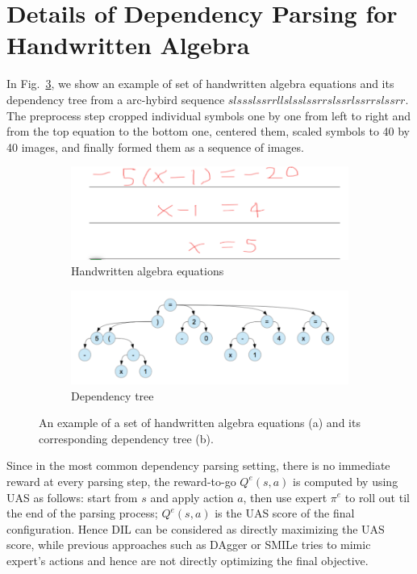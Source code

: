 \documentclass{article}
\begin{document}
\section{Details of Dependency Parsing for Handwritten Algebra}
\label{sec:parsing_example}
In Fig.~\ref{fig:algebra_example}, we show an example of set of handwritten algebra equations and its dependency tree from a arc-hybird sequence $slssslssrrllslsslssrrslssrlssrrslssrr$.  The preprocess step cropped individual symbols one by one from left to right and from the top equation to the bottom one, centered them, scaled symbols to 40 by 40 images,  and  finally formed  them  as  a  sequence of images. 

\begin{figure}[h]
	\centering
	\vspace{-2mm}
	\begin{subfigure}[l]{0.45\textwidth}
        \includegraphics[width=1.1\textwidth,keepaspectratio]{./figure/handwrittenexample.png}
        \caption{Handwritten algebra equations}
        \label{fig:cartpole}
    \end{subfigure}
	\begin{subfigure}[l]{0.5\textwidth}
        \includegraphics[width=1.1\textwidth,keepaspectratio]{./figure/handwrittentree.png}
        \caption{Dependency tree}
        \label{fig:acrobot}
    \end{subfigure}
    \caption{An example of a set of handwritten algebra equations (a) and its corresponding dependency tree (b).}
    \label{fig:algebra_example}
\end{figure}


Since in the most common dependency parsing setting, there is no immediate reward at every parsing step,
the reward-to-go $Q^e(s,a)$ is computed by using UAS as follows: start from $s$ and apply action $a$, then use expert $\pi^e$ to roll out til the end of the parsing process; $Q^e(s,a)$ is the UAS score of the final configuration. Hence DIL can be considered as directly maximizing the UAS score, while previous approaches such as DAgger or SMILe \cite{Ross2011_AISTATS} tries to mimic expert's actions and hence are not directly optimizing the final objective. 
\end{document}
